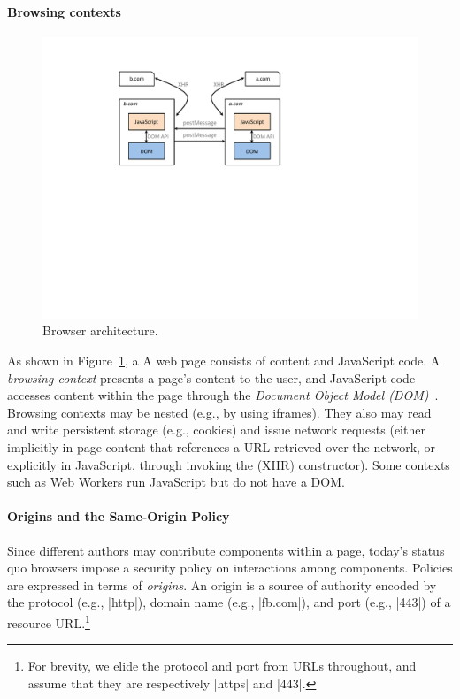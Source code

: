 \paragraph{Browsing contexts}
\iffigures
\begin{figure}
\begin{center}
\includegraphics[width=\columnwidth]{arch.pdf}
\end{center}
\vspace{-10pt}
\caption{\label{fig:primer-browser-arch} Browser architecture.}
\vspace{-10pt}
\end{figure}
As shown in Figure~\ref{fig:primer-browser-arch}, a \else A \fi web page
consists of content and JavaScript code.  A \emph{browsing context}
presents a page's content to the user, and JavaScript code accesses
content within the page through the \emph{Document Object Model
  (DOM)}~\cite{html5}. Browsing contexts may be nested (e.g., by using
iframes). They also may read and write persistent storage (e.g.,
cookies) and issue network requests (either implicitly in page content
that references a URL retrieved over the network, or explicitly in
JavaScript, through invoking the \xhr{} (XHR) constructor).  Some
contexts such as Web Workers run JavaScript but do not have a DOM.

\paragraph{Origins and the Same-Origin Policy}
Since different authors may contribute components within a page,
today's status quo browsers impose a security policy on interactions
among components. Policies are expressed in terms of \emph{origins}.
An origin is a source of authority encoded by the protocol (e.g.,
\js|http|), domain name (e.g., \js|fb.com|), and port (e.g., \js|443|)
of a resource URL.\footnote{For brevity, we elide the protocol and
  port from URLs throughout, and assume that they are respectively
  \js|https| and \js|443|.}

